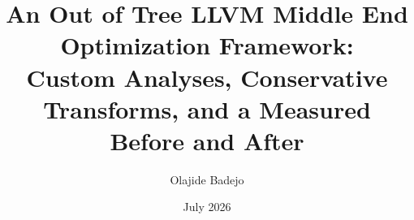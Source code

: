 \documentclass[11pt]{article}
\title{An Out of Tree LLVM Middle End Optimization Framework:\\
  Custom Analyses, Conservative Transforms, and a Measured Before and After}
\author{Olajide Badejo}
\date{July 2026}
\begin{document}
\maketitle
\begin{abstract}

\end{abstract}

\newpage
\tableofcontents
\newpage















\appendix

\end{document}
